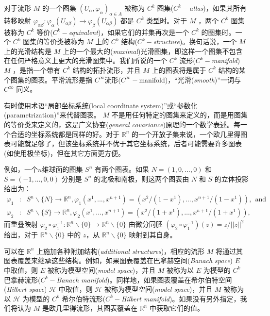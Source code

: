 \documentclass[11pt,fontset=founder]{ctexart}
\begin{document}
对于流形 $M$ 的一个图集 $( U_{\alpha },\varphi _{\alpha }) _{\alpha \in A}$ 被称为 $C^{k}$ 图集($C^{k}-$\emph{atlas})，如果其所有转移映射 $\varphi
_{\alpha \beta }:\varphi _{\alpha }( U_{\alpha \beta }) \rightarrow \varphi
_{\beta }( U_{\alpha \beta }) $ 都是 $C^{k}$ 类型时。对于 $M$ ，两个 $C^{k}$ 图集被称为 $C^{k}$ 等价($C^{k}-$\emph{equivalent})，如果它们的并集再次是一个 $C^{k}$ 的图集时。一个 $C^{k}$ 图集的等价类被称为 $M$ 上的 $C^{k}$ 结构($C^{k}-$\emph{structure})。换句话说，一个 $M$ 上的光滑结构是 $M$ 上的一个最大的(\emph{maximal})光滑图集，即这样一个图集不包含在任何严格意义上更大的光滑图集中。我们所说的一个 $C^{k}$ 流形($C^{k}-$\emph{manifold}) $M$ ，是指一个带有 $C^{k}$ 结构的拓扑流形，并且 $M$ 上的图表将是属于 $C^{k}$ 结构的某个图集的图表。平滑流形是指 $C^{\infty }$流形($C^{\infty }-$manifold)，``光滑(\emph{smooth})''一词与 $C^{\infty }$ 同义。

有时使用术语``局部坐标系统(local coordinate system)''或``参数化(parametrization)''来代替图表。 $M$ 不是用任何特定的图集来定义的，而是用图集的等价类来定义的，这是广义协变(\emph{general covariance})原理的一个数学表述。每一个合适的坐标系统都是同样的好。对于 $\mathbb{R}^{n}$ 的一个开放子集来说，一个欧几里得图表可能就足够了，但该坐标系统并不优于其它坐标系统，后者可能需要许多图表(如使用极坐标)，但在其它方面更方便。

例如，一个$n$维球面的图集 $S^{n}$ 有两个图表。如果 $N=(1,0,...,0)$ 和 $S=(-1,...,0,0)$ 分别是 $S^{n}$ 的北极和南极，则这两个图表由 $N$ 和 $S$ 的立体投影给出为：
\begin{eqnarray*}
\varphi _{1} &:&S^{n}\backslash \{N\}\rightarrow \mathbb{R}^{n},\varphi
_{1}(x^{1},...,x^{n+1})=(x^{2}/(1-x^{1}),\ldots ,x^{n+1}/(1-x^{1})),\;\,
\text{and} \\
\varphi _{2} &:&S^{n}\backslash \{S\}\rightarrow \mathbb{R}^{n},\varphi
_{2}(x^{1},...,x^{n+1})=(x^{2}/(1+x^{1}),\ldots ,x^{n+1}/(1+x^{1})),
\end{eqnarray*}
而重叠映射 $\varphi _{2}\circ \varphi _{1}^{-1}:\mathbb{R}^{n}\backslash \{0\}\rightarrow \mathbb{R}^{n}\backslash \{0\}$ 由微分同胚 $(\varphi _{2}\circ \varphi _{1}^{-1})(z)=z/||z||^{2}$ 给出，对于 $\mathbb{R}^{n}\backslash \{0\}$ 中的 $z$，从 $\mathbb{R}^{n}\backslash \{0\}$ 映射到其自身。

可以在 $\mathbb{R}^{n}$ 上施加各种附加结构(\emph{additional structures})，相应的流形 $M$ 将通过其图表覆盖来继承这些结构。例如，如果图表覆盖在巴拿赫空间(\textit{Banach space}) $E$ 中取值，则 $E$ 被称为模型空间(\textit{model space})，并且  $M$ 被称为以 $E$ 为模型的 $C^{k}$ 巴拿赫流形($C^{k}-$\textit{Banach manifold})。同样地，如果图表覆盖在希尔伯特空间(\textit{Hilbert space}) $\mathcal{H}$ 中取值，则 $\mathcal{H}$ 被称为模型空间(\textit{model space})，并且  $M$ 被称为以 $\mathcal{H}$ 为模型的 $C^{k}$ 希尔伯特流形($C^{k}-$\textit{Hilbert manifold})。如果没有另外指定，我们将认为 $M$ 是欧几里得流形，其图表覆盖在 $\mathbb{R}^{n}$ 中获取它们的值。
\end{document}
